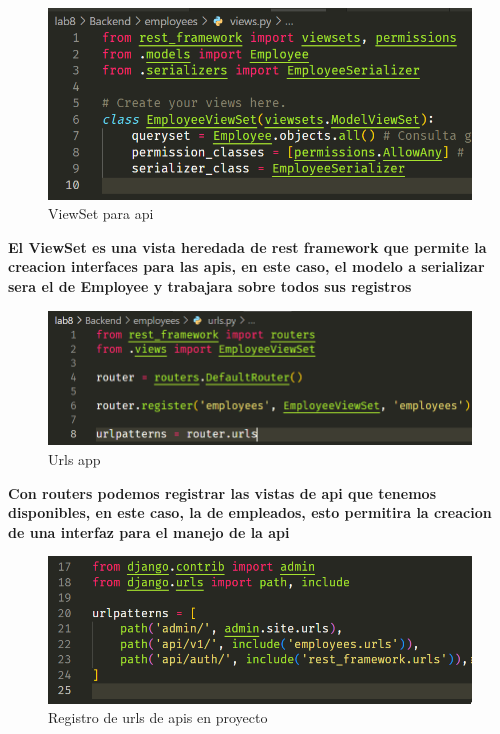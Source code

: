 \documentclass{article}
\begin{document}
        \begin{figure}[ht]
            \centering
            \includegraphics{img/img3.png}
            \caption{ViewSet para api}
            \label{fig:enter-label}
        \end{figure}
        \textbf{El ViewSet es una vista heredada de rest framework que permite la creacion interfaces para las apis, en este caso, el modelo a serializar sera el de Employee y trabajara sobre todos sus registros}

        
        \begin{figure}[ht]
            \centering
            \includegraphics[scale=0.7]{img/img4.png}
            \caption{Urls app}
            \label{fig:enter-label}
        \end{figure}
        \textbf{Con routers podemos registrar las vistas de api que tenemos disponibles, en este caso, la de empleados, esto permitira la creacion de una interfaz para el manejo de la api}
        \newpage
        
        \begin{figure}[ht]
            \centering
            \includegraphics[scale=0.5]{img/img5.png}
            \caption{Registro de urls de apis en proyecto}
            \label{fig:enter-label}
        \end{figure}
\end{document}
